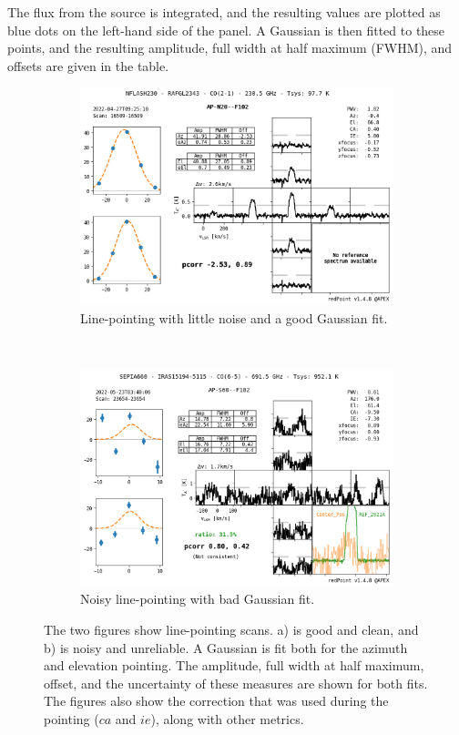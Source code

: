 The flux from the source is integrated, and the resulting values are plotted as blue dots on the left-hand side of the panel.
A Gaussian is then fitted to these points, and the resulting amplitude, full width at half maximum (FWHM), and offsets are given in the table.

\begin{figure}[H]
    \centering
     \begin{subfigure}[b]{0.75\textwidth}
         \centering
         \includegraphics[width=\textwidth]{Pointing Scans/good_line.png}
         \caption{Line-pointing with little noise and a good Gaussian fit.}
         \label{subfig:good_line}
     \end{subfigure}
    \\
     \begin{subfigure}[b]{0.75\textwidth}
         \centering
         \includegraphics[width=\textwidth]{Pointing Scans/bad_line.png}
         \caption{Noisy line-pointing with bad Gaussian fit.}
         \label{subfig:bad_line}
     \end{subfigure}
    \caption{The two figures show line-pointing scans. a) is good and clean, and b) is noisy and unreliable. A Gaussian is fit both for the azimuth and elevation pointing.
    The amplitude, full width at half maximum, offset, and the uncertainty of these measures are shown for both fits.
    The figures also show the correction that was used during the pointing ($ca$ and $ie$), along with other metrics.}
    \label{fig:line_pointings}
\end{figure}

